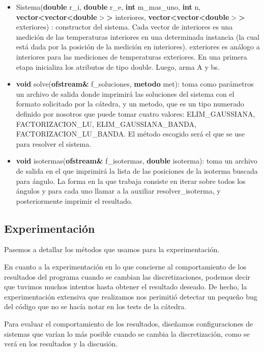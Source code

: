 \begin{itemize}
	\item Sistema(\textbf{double} r\_i,
					\textbf{double} r\_e,
          \textbf{int} m\_mas\_uno,
          \textbf{int} n,
          \textbf{vector<vector<double$>$>} interiores,
          \textbf{vector<vector<double$>$>} exteriores)	:
  		constructor del sistema. Cada vector de interiores es una medición de las temperaturas interiores en una determinada instancia (la cual está dada por la posición de la medición en interiores). exteriores es análogo a interiores para las mediciones de temperaturas exteriores. En una primera etapa inicializa los atributos de tipo double. Luego, arma A y bs.
          
  \item \textbf{void} solve(\textbf{ofstream\&} f\_soluciones, \textbf{metodo} met):	toma como parámetros un archivo de salida donde imprimirá las soluciones del sistema con el formato solicitado por la cátedra, y un metodo, que es un tipo numerado definido por nosotros que puede tomar cuatro valores: ELIM\_GAUSSIANA, \mbox{FACTORIZACION\_LU,} ELIM\_GAUSSIANA\_BANDA, FACTORIZACION\_LU\_BANDA. El método escogido será el que se use para resolver el sistema.

  \item \textbf{void} isotermas(\textbf{ofstream\&} f\_isotermas, \textbf{double} isoterma): toma un archivo de salida en el que imprimirá la lista de las posiciones de la isoterma buscada para ángulo. La forma en la que trabaja consiste en iterar sobre todos los ángulos y para cada uno llamar a la auxiliar resolver\_isoterma, y posteriormente imprimir el resultado.   

\end{itemize}

\subsection{Experimentación}

Pasemos a detallar los métodos que usamos para la experimentación.

En cuanto a la experimentación en lo que concierne al comportamiento de los resultados del programa cuando se cambian las discretizaciones, podemos decir que tuvimos muchos intentos hasta obtener el resultado deseado. De hecho, la experimentación extensiva que realizamos nos perimitió detectar un pequeño bug del código que no se hacía notar en los tests de la cátedra.

Para evaluar el comportamiento de los resultados, diseñamos configuraciones de sistemas que varían lo más posible cuando se cambia la discretización, como se verá en los resultados y la discusión.

